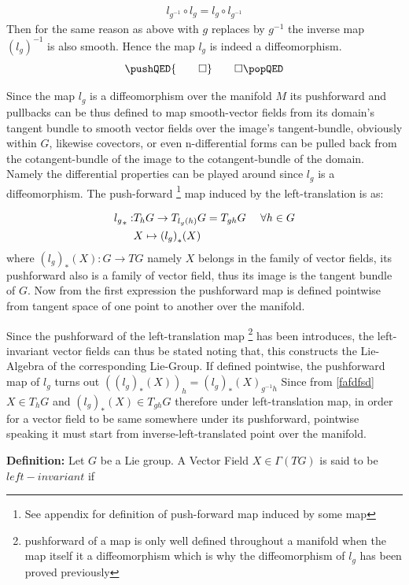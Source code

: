 \documentclass[8pt, twocoloumn]{article}
\begin{document}
 \begin{align}
     l_{g^{-1}} \circ l_{g} =  l_{g}  \circ l_{g^{-1}} 
 \end{align}
 Then for the same reason as above with $g$ replaces by $g^{-1}$ the inverse map ${(l_g)}^{-1}$ is also smooth. Hence the map $l_g$ is indeed a diffeomorphism.  
 \[
\pushQED{\qed} \qedhere
\popQED
\]  
 
 Since the map $l_g$ is a diffeomorphism over the manifold $M$ its pushforward and pullbacks can be thus defined to map smooth-vector fields from its domain's tangent bundle to smooth vector fields over the image's tangent-bundle, obviously within $G$, likewise covectors, or even n-differential forms can be pulled back from the cotangent-bundle of the image to the cotangent-bundle of the domain. Namely the differential properties can be played around since $l_g$ is a diffeomorphism.  The push-forward \footnote{See appendix for definition of push-forward map induced by some map} map induced by the left-translation is as:
 
 \begin{align}{\label{fafdfsd}}
     {l_g}_{*} :& T_hG \to T_{l_g(h)}G = T_{gh}G  \ \ \ \ \forall h \in G \notag \\ 
     & X \mapsto {(l_g)}_{*}(X) \notag
     \end{align}
where $ {(l_g)}_{*}(X) : G \to TG $ namely $X$ belongs in the family of vector fields, its pushforward also is a family of vector field, thus its image is the tangent bundle of $G$. Now from the first expression the pushforward map is defined pointwise from tangent space of one point to another over the manifold.

Since the pushforward of the left-translation map \footnote{pushforward of a map is only well defined throughout a manifold when the map itself it a diffeomorphism which is why the diffeomorphism of $l_g$ has been proved previously} has been introduces, the left-invariant vector fields can thus be stated noting that, this constructs the Lie-Algebra of the corresponding Lie-Group.  If defined pointwise, the pushforward map of $l_g$ turns out ${({(l_g)}_{*}(X))}_{h} = {(l_g)}_{*}(X)_{g^{-1}h}$ Since from \ref{fafdfsd}$X \in T_hG$ and ${(l_g)}_{*}(X) \in T_{gh}G$ therefore under left-translation map, in order for a vector field to be same somewhere under its pushforward, pointwise speaking it must start from inverse-left-translated point over the manifold.

\textbf{Definition:} Let $G$ be a Lie group. A Vector Field $X \in \Gamma(TG)$ is said to be $left-invariant$ if
\end{document}
